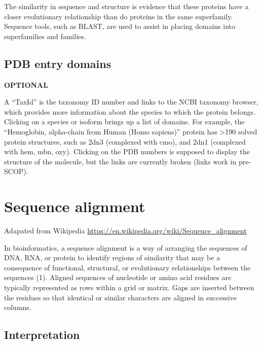 \documentclass[
]{book}
\begin{document}
The similarity in sequence and structure is evidence that these proteins have a closer evolutionary relationship than do proteins in the same superfamily. Sequence tools, such as BLAST, are used to assist in placing domains into superfamilies and families.

\hypertarget{pdb-entry-domains}{%
\subsection{PDB entry domains}\label{pdb-entry-domains}}

\textbf{OPTIONAL}

A ``TaxId'' is the taxonomy ID number and links to the NCBI taxonomy browser, which provides more information about the species to which the protein belongs. Clicking on a species or isoform brings up a list of domains. For example, the ``Hemoglobin, alpha-chain from Human (Homo sapiens)'' protein has \textgreater190 solved protein structures, such as 2dn3 (complexed with cmo), and 2dn1 (complexed with hem, mbn, oxy). Clicking on the PDB numbers is supposed to display the structure of the molecule, but the links are currently broken (links work in pre-SCOP).

\hypertarget{sequence-alignment}{%
\section{Sequence alignment}\label{sequence-alignment}}

Adapated from Wikipedia
\url{https://en.wikipedia.org/wiki/Sequence_alignment}

In bioinformatics, a sequence alignment is a way of arranging the sequences of DNA, RNA, or protein to identify regions of similarity that may be a consequence of functional, structural, or evolutionary relationships between the sequences (1). Aligned sequences of nucleotide or amino acid residues are typically represented as rows within a grid or matrix. Gaps are inserted between the residues so that identical or similar characters are aligned in successive columns.

\hypertarget{interpretation}{%
\subsection{Interpretation}\label{interpretation}}
\end{document}
